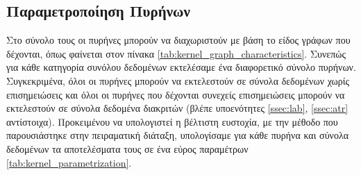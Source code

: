 \subsection{Παραμετροποίηση Πυρήνων}
Στο σύνολο τους οι πυρήνες μπορούν να διαχωριστούν με βάση το είδος γράφων που δέχονται, όπως φαίνεται στον πίνακα \ref{tab:kernel_graph_characteristics}.
Συνεπώς για κάθε κατηγορία συνόλου δεδομένων εκτελέσαμε ένα διαφορετικό σύνολο πυρήνων.
Συγκεκριμένα, όλοι οι πυρήνες μπορούν να εκτελεστούν σε σύνολα δεδομένων χωρίς επισημειώσεις και όλοι οι πυρήνες που δέχονται συνεχείς επισημειώσεις μπορούν να εκτελεστούν σε σύνολα δεδομένα διακριτών (βλέπε υποενότητες \ref{ssec:lab}, \ref{ssec:atr} αντίστοιχα).
Προκειμένου να υπολογιστεί η βέλτιστη ευστοχία, με την μέθοδο που παρουσιάστηκε στην πειραματική διάταξη, υπολογίσαμε για κάθε πυρήνα και σύνολα δεδομένων τα αποτελέσματα τους σε ένα εύρος παραμέτρων \ref{tab:kernel_parametrization}.
